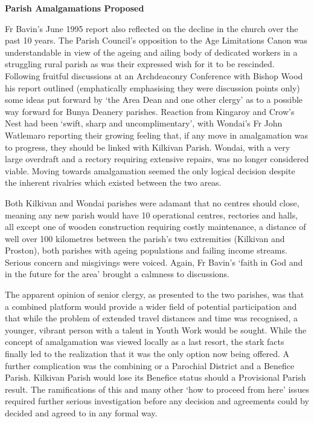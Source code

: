 \textbf{Parish Amalgamations Proposed}

Fr Bavin's June 1995 report also reflected on the decline in the church over the past 10 years. The Parish Council's opposition to the Age Limitations Canon was understandable in view of the ageing and ailing body of dedicated workers in a struggling rural parish as was their expressed wish for it to be rescinded. Following fruitful discussions at an Archdeaconry Conference with Bishop Wood his report outlined (emphatically emphasising they were discussion points only) some ideas put forward by `the Area Dean and one other clergy' as to a possible way forward for Bunya Deanery parishes. Reaction from Kingaroy and Crow's Nest had been `swift, sharp and uncomplimentary', with Wondai's Fr John Watlemaro reporting their growing feeling that, if any move in amalgamation was to progress, they should be linked with Kilkivan Parish. Wondai, with a very large overdraft and a rectory requiring extensive repairs, was no longer considered viable. Moving towards amalgamation seemed the only logical decision despite the inherent rivalries which existed between the two areas.

Both Kilkivan and Wondai parishes were adamant that no centres should close, meaning any new parish would have 10 operational centres, rectories and halls, all except one of wooden construction requiring costly maintenance, a distance of well over 100 kilometres between the parish's two extremities (Kilkivan and Proston), both parishes with ageing populations and failing income streams. Serious concern and misgivings were voiced. Again, Fr Bavin's `faith in God and in the future for the area' brought a calmness to discussions.

The apparent opinion of senior clergy, as presented to the two parishes, was that a combined platform would provide a wider field of potential participation and that while the problem of extended travel distances and time was recognised, a younger, vibrant person with a talent in Youth Work would be sought. While the concept of amalgamation was viewed locally as a last resort, the stark facts finally led to the realization that it was the only option now being offered. A further complication was the combining or a Parochial District and a Benefice Parish. Kilkivan Parish would lose its Benefice status should a Provisional Parish result. The ramifications of this and many other `how to proceed from here' issues required further serious investigation before any decision and agreements could by decided and agreed to in any formal way.

